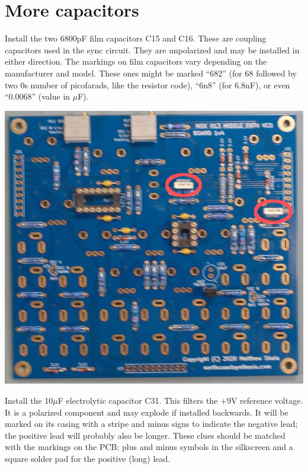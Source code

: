 \section{More capacitors}

Install the two 6800pF film capacitors C15 and C16.  These are coupling
capacitors used in the sync circuit.  They are unpolarized and may be
installed in either direction.  The markings on film capacitors vary
depending on the manufacturer and model.  These ones might be marked ``682''
(for 68 followed by two 0s number of picofarads, like the resistor code),
``6n8'' (for 6.8nF), or even ``0.0068'' (value in $\mu$F).

\nopagebreak
\noindent\includegraphics[width=\linewidth]{cap-6800p.jpg}

Install the 10$\mu$F electrolytic capacitor C31.  This filters the +9V
reference voltage.  It is a polarized component and may explode if installed
backwards.  It will be marked on its casing with a stripe and minus
signs to indicate the negative lead; the positive lead will probably also be
longer.  These clues should be matched with the markings on the PCB: plus
and minus symbols in the silkscreen and a square solder pad for the positive
(long) lead.

